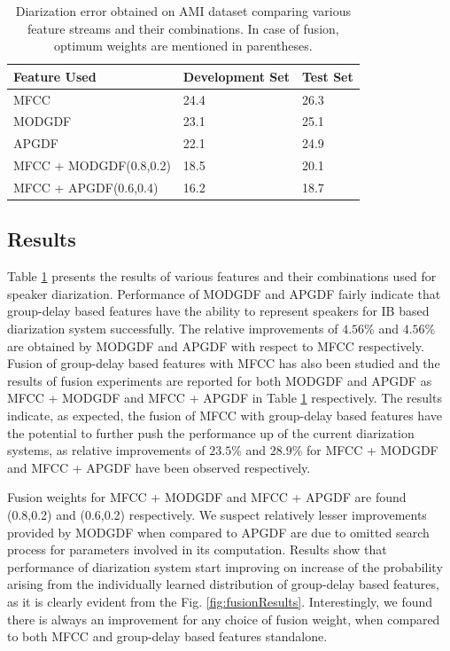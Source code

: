 \documentclass[conference]{IEEEtran}
\begin{document}
\begin{table}[h]
\centering
\label{my-label}
\begin{tabular}{|l|l|l|}
\hline
Feature Used  & Development Set & Test Set \\ \hline
MFCC          & 24.4                   & 26.3            \\ \hline
MODGDF        & 23.1                   & 25.1            \\ \hline
APGDF         & 22.1                   & 24.9            \\ \hline
MFCC + MODGDF(0.8,0.2) & 18.5          & 20.1            \\ \hline
MFCC + APGDF(0.6,0.4)  & 16.2          & 18.7            \\ \hline
\end{tabular}
\vspace{0.4cm}
\label{table:results}
\caption{Diarization error obtained on AMI dataset comparing various feature
streams and their combinations. In case of fusion, optimum weights are mentioned
in parentheses.}
\end{table}


\subsection{Results}

Table \ref{table:results} presents the results of various features and their
combinations used for speaker diarization. Performance of MODGDF and APGDF
fairly indicate that group-delay based features have the ability to represent
speakers for IB based diarization system successfully. The relative improvements
of $4.56\%$ and $4.56\%$ are obtained by MODGDF and APGDF with respect to MFCC
respectively. Fusion of group-delay based features with MFCC has also been
studied and the results of fusion experiments are reported for both MODGDF and
APGDF as MFCC + MODGDF and MFCC + APGDF in Table \ref{table:results}
respectively. The results indicate, as expected, the fusion of MFCC with
group-delay based features have the potential to further push the performance up
of the current diarization systems, as relative improvements of $23.5\%$ and
$28.9\%$ for MFCC + MODGDF and MFCC + APGDF have been observed respectively.

Fusion weights for MFCC + MODGDF and MFCC + APGDF are found (0.8,0.2) and
(0.6,0.2) respectively. We suspect relatively lesser improvements provided by
MODGDF when compared to APGDF are due to omitted search process for parameters
involved in its computation. Results show that performance of diarization system
start improving on increase of the probability arising from the individually
learned distribution of group-delay based features, as it is clearly evident
from the Fig. \ref{fig:fusionResults}. Interestingly, we found there is always
an improvement for any choice of fusion weight, when compared to both MFCC and
group-delay based features standalone.     
\end{document}
